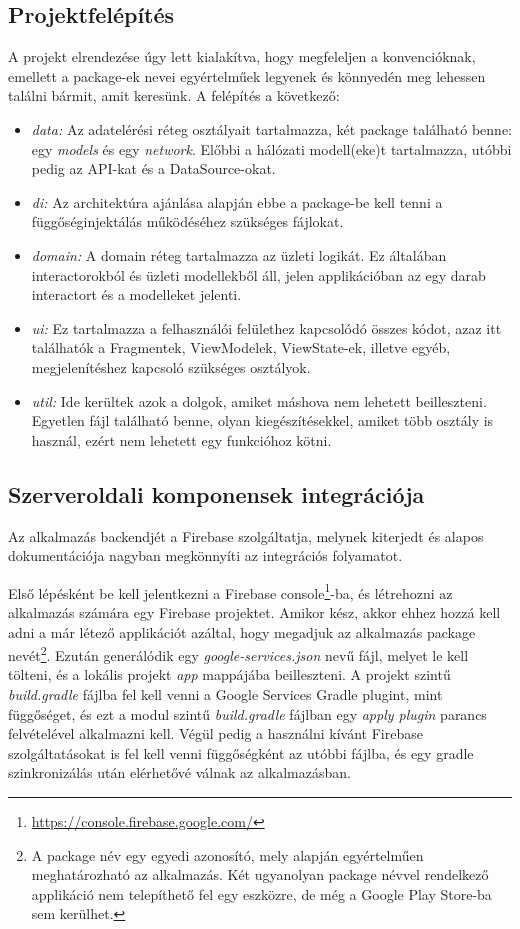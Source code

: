 \subsection{Projektfelépítés}
A projekt elrendezése úgy lett kialakítva, hogy megfeleljen a konvencióknak, emellett a package-ek nevei egyértelműek legyenek és könnyedén meg lehessen találni bármit, amit keresünk. A felépítés a következő:
\begin{itemize}
	\item \emph{data:} Az adatelérési réteg osztályait tartalmazza, két package található benne: egy \emph{models} és egy \emph{network}. Előbbi a hálózati modell(eke)t tartalmazza, utóbbi pedig az API-kat és a DataSource-okat. 
	\item \emph{di:} Az architektúra ajánlása alapján ebbe a package-be kell tenni a függőséginjektálás működéséhez szükséges fájlokat.
	\item \emph{domain:} A domain réteg tartalmazza az üzleti logikát. Ez általában interactorokból és üzleti modellekből áll, jelen applikációban az egy darab interactort és a modelleket jelenti. 
	\item \emph{ui:} Ez tartalmazza a felhasználói felülethez kapcsolódó összes kódot, azaz itt találhatók a Fragmentek, ViewModelek, ViewState-ek, illetve egyéb, megjelenítéshez kapcsoló szükséges osztályok. 
	\item \emph{util:} Ide kerültek azok a dolgok, amiket máshova nem lehetett beilleszteni. Egyetlen fájl található benne, olyan kiegészítésekkel, amiket több osztály is használ, ezért nem lehetett egy funkcióhoz kötni.
\end{itemize}

\subsection{Szerveroldali komponensek integrációja}
Az alkalmazás backendjét a Firebase szolgáltatja, melynek kiterjedt és alapos dokumentációja nagyban megkönnyíti az integrációs folyamatot. 

Első lépésként be kell jelentkezni a Firebase console\footnote{\url{https://console.firebase.google.com/}}-ba, és létrehozni az alkalmazás számára egy Firebase projektet. Amikor kész, akkor ehhez hozzá kell adni a már létező applikációt azáltal, hogy megadjuk az alkalmazás package nevét\footnote{A package név egy egyedi azonosító, mely alapján egyértelműen meghatározható az alkalmazás. Két ugyanolyan package névvel rendelkező applikáció nem telepíthető fel egy eszközre, de még a Google Play Store-ba sem kerülhet.}. Ezután generálódik egy \emph{google-services.json} nevű fájl, melyet le kell tölteni, és a lokális projekt \emph{app} mappájába beilleszteni. A projekt szintű \emph{build.gradle} fájlba fel kell venni a Google Services Gradle plugint, mint függőséget, és ezt a modul szintű \emph{build.gradle} fájlban egy \emph{apply plugin} parancs felvételével alkalmazni kell. Végül pedig a használni kívánt Firebase szolgáltatásokat is fel kell venni függőségként az utóbbi fájlba, és egy gradle szinkronizálás után elérhetővé válnak az alkalmazásban.


